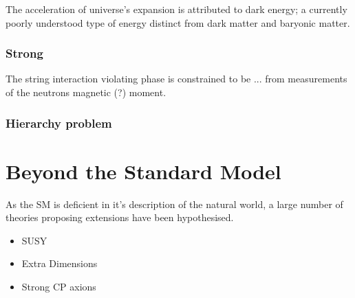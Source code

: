 The acceleration of universe's expansion is attributed to dark energy; a currently poorly understood type of energy distinct from dark matter and baryonic matter.

\subsubsection{Strong \CP}  
The string interaction \CP violating phase is constrained to be  ... from measurements of the neutrons magnetic (?) moment. 

\subsubsection{Hierarchy problem}



\section{Beyond the Standard Model}
As the SM is deficient in it's description of the natural world, a large number of theories proposing extensions have been hypothesised.


{\color{Red}
\begin{itemize}
\item SUSY
\item Extra Dimensions
\item Strong CP axions 
\end{itemize}
}
